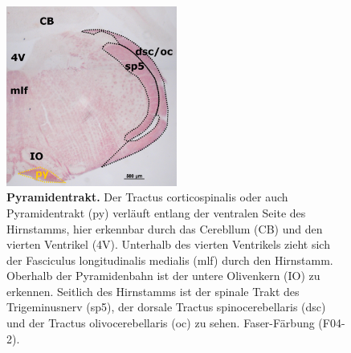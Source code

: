 \begin{figure}[H]
    \centering
    \includegraphics[width=0.5\textwidth]{pictures/Bilder_Laura/py_F04_2P_025x.png}
    \caption[Pyramidentrakt]{\textbf{Pyramidentrakt.} Der Tractus corticospinalis oder auch Pyramidentrakt (py) verläuft entlang der ventralen Seite des Hirnstamms, hier erkennbar durch das Cerebllum (CB) und den vierten Ventrikel (4V). Unterhalb des vierten Ventrikels zieht sich der Fasciculus longitudinalis medialis (mlf) durch den Hirnstamm. Oberhalb der Pyramidenbahn ist der untere Olivenkern (IO) zu erkennen. Seitlich des Hirnstamms ist der spinale Trakt des Trigeminusnerv (sp5), der dorsale Tractus spinocerebellaris (dsc) und der Tractus olivocerebellaris (oc) zu sehen. Faser-Färbung (F04-2).}
    \label{fig:pyramidentrakt}
\end{figure}

